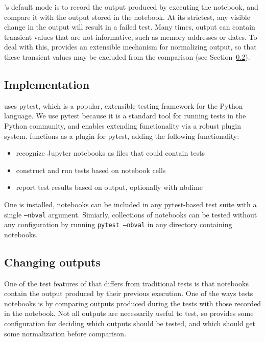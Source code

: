 \documentclass{deliverablereport}
\begin{document}
\nbval's default mode is to record the output produced by executing
the notebook, and compare it with the output stored in the notebook.
At its strictest, any visible change in the output will result in a
failed test.  Many times, output can contain transient values that are
not informative, such as memory addresses or dates.  To deal with
this, \nbval provides an extensible mechanism for normalizing output,
so that these transient values may be excluded from the comparison
(see Section~\ref{sec:changing-outputs}).

\subsection{Implementation}

\nbval uses pytest, which is a popular, extensible testing framework for the Python language.
We use pytest because it is a standard tool for running tests in the Python community,
and enables extending functionality via a robust plugin system.
\nbval functions as a plugin for pytest, adding the following functionality:

\begin{itemize}
\item recognize Jupyter notebooks as files that could contain tests
\item construct and run tests based on notebook cells
\item report test results based on output, optionally with nbdime
\end{itemize}

One \nbval is installed, notebooks can be included in any pytest-based test suite
with a single \texttt{--nbval} argument.
Simiarly, collections of notebooks can be tested without any configuration by running
\texttt{pytest --nbval} in any directory containing notebooks.


\subsection{Changing outputs}\label{sec:changing-outputs}

One of the test features of \nbval that differs from traditional tests
is that notebooks contain the output produced by their previous execution.
One of the ways \nbval tests notebooks is by comparing outputs produced during the tests
with those recorded in the notebook.
Not all outputs are necessarily useful to test,
so \nbval provides some configuration for deciding which outputs should be tested,
and which should get some normalization before comparison.
\end{document}
